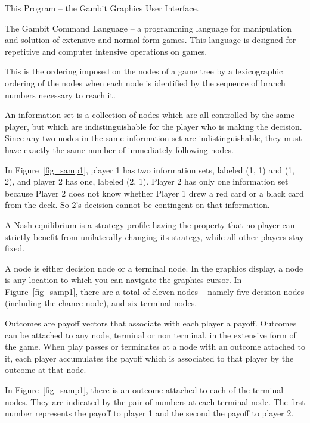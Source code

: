 \begin{helpglossary}
\label{guigloss}
This Program -- the Gambit Graphics User Interface.

\label{gclgloss}
The Gambit Command Language -- a programming language for manipulation and
solution of extensive and normal form games.  This language is designed
for repetitive and computer intensive operations on games.  

\label{indextravgloss}
This is the ordering imposed on the nodes of a game tree by a lexicographic 
ordering of the nodes when each node is identified by the sequence of branch 
numbers necessary to reach it.  

\label{infosetgloss}
An information set is a collection of nodes which are all controlled by
the same player, but which are indistinguishable 
for the player who is making the decision.  Since any two nodes 
in the same information set are indistinguishable, they must have exactly 
the same number of immediately following nodes. 

In Figure~\ref{fig_samp1}, player 1 has two information
sets, labeled (1, 1) and (1, 2), and player 2 has one, labeled (2, 1).
Player 2 has only one information set because Player 2 does not know whether
 Player 1 drew a red card or a black card from the deck.  So 2's decision 
cannot be contingent on that information.

\label{nashequigloss}
A Nash equilibrium is a strategy profile having the property that no player 
can strictly benefit from unilaterally changing its strategy, while all 
other players stay fixed.  

\label{nodegloss}
A node is either decision node or a terminal node.  In the graphics 
display, a node is any location to which you can navigate the graphics 
cursor. In Figure~\ref{fig_samp1}, there are a total of eleven nodes -- namely 
five decision nodes (including the chance node), and six terminal nodes.  

\label{outcomegloss}
Outcomes are payoff vectors that associate with each player a payoff.  
Outcomes can be attached to any node, terminal or non terminal, in the 
extensive form of the game.  When play passes or terminates at a node 
with an outcome attached to it, each player accumulates the payoff which 
is associated to that player by the outcome at that node. 

In Figure~\ref{fig_samp1}, there is an outcome attached to each of the
terminal nodes.  They are indicated by the pair of numbers at each
terminal node.  The first number represents the payoff to player 1 and the
second the payoff to player 2.


\end{helpglossary}

